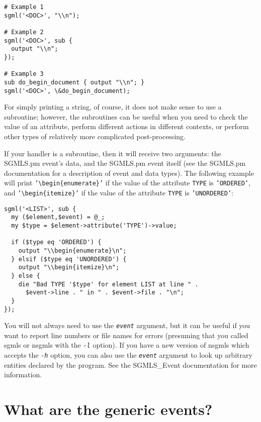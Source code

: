 {\footnotesize\begin{verbatim}
# Example 1
sgml('<DOC>', "\\n");

# Example 2
sgml('<DOC>', sub {
  output "\\n";
});

# Example 3
sub do_begin_document { output "\\n"; }
sgml('<DOC>', \&do_begin_document);
\end{verbatim}}

For simply printing a string, of course, it does not make sense
to use a subroutine; however, the subroutines can be useful when you
need to check the value of an attribute, perform different actions in
different contexts, or perform other types of relatively more
complicated post-processing.

If your handler is a subroutine, then it will receive two
arguments: the {\sc SGMLS.pm} event's data, and the {\sc SGMLS.pm} event
itself (see the {\sc SGMLS.pm} documentation for a description
of event and data types).  The following example will print
{\tt '\verb|\|begin\{enumerate\}'} if the value of the attribute
{\tt TYPE} is {\tt 'ORDERED'}, and
{\tt '\verb|\|begin\{itemize\}'} if the value of the attribute
{\tt TYPE} is {\tt 'UNORDERED'}:

{\footnotesize\begin{verbatim}
sgml('<LIST>', sub {
  my ($element,$event) = @_;
  my $type = $element->attribute('TYPE')->value;

  if ($type eq 'ORDERED') {
    output "\\begin{enumerate}\n";
  } elsif ($type eq 'UNORDERED') {
    output "\\begin{itemize}\n";
  } else {
    die "Bad TYPE '$type' for element LIST at line " .
      $event->line . " in " . $event->file . "\n";
  }
});
\end{verbatim}}

You will not always need to use the {\tt\sl event\/}
argument, but it can be useful if you want to report line numbers or
file names for errors (presuming that you called {\sc sgmls} or {\sc nsgmls}
with the {\tt\sl -l\/} option).  If you have a new version
of {\sc nsgmls} which accepts the {\tt\sl -h\/} option, you
can also use the {\tt\sl event\/} argument to look up
arbitrary entities declared by the program. See the SGMLS\_Event documentation for
more information.




\section{What are the generic events?}
\label{GENERIC}


